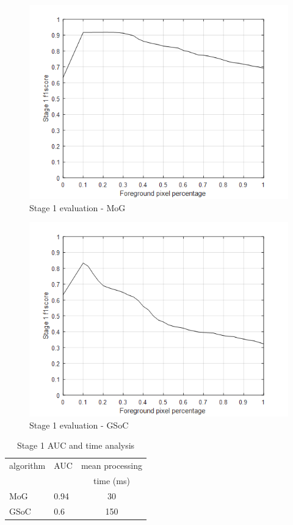 \begin{figure}
    \centering
    \includegraphics[width=\linewidth]{images/f1-analysis-mog.png}
    \caption{Stage 1 evaluation - MoG}
    \label{fig:f1-analysis-mog}
\end{figure}

\begin{figure}
    \centering
    \includegraphics[width=\linewidth]{images/f1-analysis-gsoc.png}
    \caption{Stage 1 evaluation - GSoC}
    \label{fig:f1-analysis-gsoc}
\end{figure}

\begin{table}
\centering
\caption{Stage 1 AUC and time analysis} \vspace{5pt}
\label{table:auc-time-analysis-s1}
\begin{tabular}{|l|l|c|}
\hline
algorithm   & AUC     & mean processing \\
            &         &  time (ms)  \\ \hline \hline
MoG         & 0.94    & 30    \\
GSoC        & 0.6     & 150  \\ \hline
\end{tabular}
\end{table}

